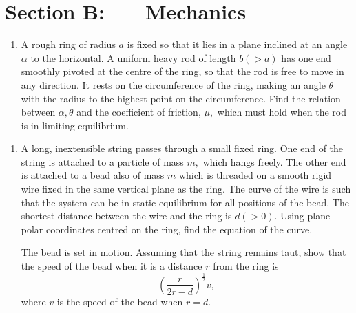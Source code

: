 \documentclass[a4, 11pt]{report}
\newlength{\qspace}
\newcounter{qnumber}
\newenvironment{question}%
 {\vspace{\qspace}
  \begin{enumerate}[\bfseries 1\quad][10]%
    \setcounter{enumi}{\value{qnumber}}%
    \item%
 }
{
  \end{enumerate}
  \filbreak
  \stepcounter{qnumber}
 }
\begin{document}
		
		
		
	
\newpage
\section*{Section B: \ \ \ Mechanics}


	
\begin{question}
	A rough ring of radius $a$ is fixed so that it lies in a plane inclined
	at an angle $\alpha$ to the horizontal. A uniform heavy rod of length
	$b(>a)$ has one end smoothly pivoted at the centre of the ring, so
	that the rod is free to move in any direction. It rests on the circumference
	of the ring, making an angle $\theta$ with the radius to the highest
	point on the circumference. Find the relation between $\alpha,\theta$
	and the coefficient of friction, $\mu,$ which must hold when the
	rod is in limiting equilibrium. 

	\end{question}
	
\begin{question}	
A long, inextensible string passes through a small fixed ring. One
end of the string is attached to a particle of mass $m,$ which hangs
freely. The other end is attached to a bead also of mass $m$ which
is threaded on a smooth rigid wire fixed in the same vertical plane
as the ring. The curve of the wire is such that the system can be
in static equilibrium for all positions of the bead. The shortest
distance between the wire and the ring is $d(>0).$ Using plane polar
coordinates centred on the ring, find the equation of the curve. 


The bead is set in motion. Assuming that the string remains taut,
show that the speed of the bead when it is a distance $r$ from the
ring is 
\[
\left(\frac{r}{2r-d}\right)^{\frac{1}{2}}v,
\]
where $v$ is the speed of the bead when $r=d.$ 
\end{question}

\end{document}
